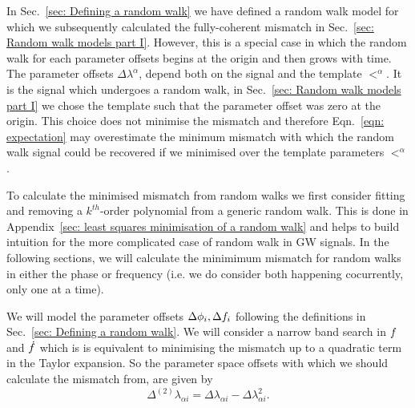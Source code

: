 
In Sec.~\ref{sec: Defining a random walk} we have defined a random walk model
for which we subsequently calculated the fully-coherent mismatch in
Sec.~\ref{sec: Random walk models part I}. However, this is a special case in
which the random walk for each parameter offsets begins at the origin and then
grows with time. The parameter offsets $\Delta\lambda^{\alpha}$, depend both on
the signal and the template $\lt^{\alpha}$. It is the signal which undergoes a random walk, in Sec.~\ref{sec:
Random walk models part I} we chose the template such that the parameter offset
was zero at the origin. This choice does not minimise the mismatch and therefore
Eqn.~\eqref{eqn: expectation} may overestimate the minimum mismatch
with which the random walk signal could be recovered if we minimised over the
template parameters $\lt^{\alpha}$.

To calculate the minimised mismatch from random walks we first consider
fitting and removing a $k^{th}$-order polynomial from a generic random walk. This
is done in Appendix~\ref{sec: least squares minimisation of a random walk} and
helps to build intuition for the more complicated case of random walk in
GW signals. In the following sections, we will calculate the minimimum
mismatch for random walks in either the phase or frequency (i.e. we do
consider both happening cocurrently, only one at a time).

We will model the parameter offsets $\Delta\phi_{i}, \Delta f_{i}$
following the definitions in Sec.~\ref{sec: Defining a random walk}.
We will consider a narrow band search in $f$ and $\dot{f}$ which is
is equivalent to minimising the mismatch up to a quadratic term in the Taylor
expansion. So the parameter space offsets with which we should calculate the
mismatch from, are given by
\begin{equation}
\Delta^{(2)}\lambda_{\alpha i} = \Delta\lambda_{\alpha i} - \Delta\lambda_{\alpha i}^{2}.
\end{equation}


